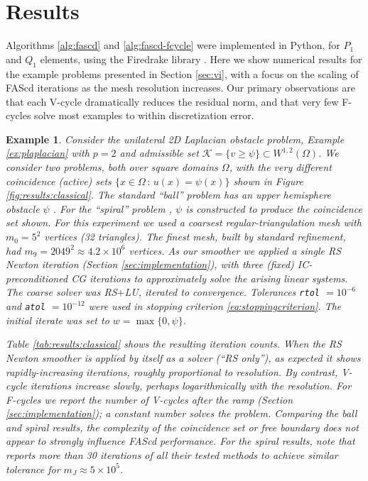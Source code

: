 \documentclass[letterpaper,final,12pt,reqno]{amsart}
\theoremstyle{cstyle}
\theoremstyle{cstyle*}
\theoremstyle{dstyle}
\newtheorem{example}[theorem]{Example}
\numberwithin{equation}{section}
\numberwithin{figure}{section}
\numberwithin{table}{section}
\numberwithin{theorem}{section}
\begin{document}
\section{Results} \label{sec:results}

Algorithms \ref{alg:fascd} and \ref{alg:fascd-fcycle} were implemented in Python, for $P_1$ and $Q_1$ elements, using the Firedrake library \cite{Rathgeberetal2016}.  Here we show numerical results for the example problems presented in Section \ref{sec:vi}, with a focus on the scaling of FAScd iterations as the mesh resolution increases.  Our primary observations are that each V-cycle dramatically reduces the residual norm, and that very few F-cycles solve most examples to within discretization error.

\begin{example} \label{ex:results:classical}
Consider the unilateral 2D Laplacian obstacle problem, Example \ref{ex:plaplacian} with $p=2$ and admissible set $\mathcal{K} = \{v \ge \psi\} \subset W^{1,2}(\Omega)$.  We consider two problems, both over square domains $\Omega$, with the very different coincidence (active) sets $\{x\in\Omega \,:\, u(x)=\psi(x)\}$ shown in Figure \ref{fig:results:classical}.  The standard ``ball'' problem has an upper hemisphere obstacle $\psi$ \cite[Chapter 12]{Bueler2021}.  For the ``spiral'' problem \cite[problem 7.1.1]{GraeserKornhuber2009}, $\psi$ is constructed to produce the coincidence set shown.  For this experiment we used a coarsest regular-triangulation mesh with $m_0=5^2$ vertices (32 triangles).  The finest mesh, built by standard refinement, had $m_9=2049^2 \approx 4.2 \times 10^{6}$ vertices.  As our smoother we applied a single RS Newton iteration (Section \ref{sec:implementation}), with three (fixed) IC-preconditioned CG iterations to approximately solve the arising linear systems.  The coarse solver was RS$+$LU, iterated to convergence.  Tolerances \texttt{rtol} $= 10^{-6}$ and \texttt{atol} $= 10^{-12}$ were used in stopping criterion \eqref{eq:stoppingcriterion}.  The initial iterate was set to $w=\max\{0,\psi\}$.

Table \ref{tab:results:classical} shows the resulting iteration counts.  When the RS Newton smoother is applied by itself as a solver (``RS only''), as expected it shows rapidly-increasing iterations, roughly proportional to resolution.  By contrast, V-cycle iterations increase slowly, perhaps logarithmically with the resolution.  For F-cycles we report the number of V-cycles after the ramp (Section \ref{sec:implementation}); a constant number solves the problem.  Comparing the ball and spiral results, the complexity of the coincidence set or free boundary does not appear to strongly influence FAScd performance.  For the spiral results, note that \cite{GraeserKornhuber2009} reports more than 30 iterations of all their tested methods to achieve similar tolerance for $m_J \approx 5\times 10^5$.


\end{example}
\end{document}

